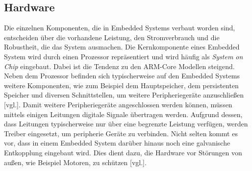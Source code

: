 \subsection{Hardware}
\label{subsec:EmbeddedHardware}
Die einzelnen Komponenten, die in Embedded Systems verbaut worden sind, entscheiden über
die vorhandene Leistung, den Stromverbrauch und die Robustheit, die das System ausmachen. Die
Kernkomponente eines Embedded System wird durch einen Prozessor repräsentiert und
wird häufig als \emph{System on Chip} eingebaut. Dabei ist die Tendenz zu den ARM-Core Modellen
steigend. Neben dem Prozessor befinden sich typischerweise auf den Embedded Systems
weitere Komponenten, wie zum Beispiel dem Hauptspeicher, dem persistenten Speicher und diversen
Schnittstellen, um weitere Peripheriegeräte anzuschließen \cite{EmbeddeHardware}[vgl.].
\newline
\newline
Damit weitere Peripheriegeräte angeschlossen werden können, müssen mittels einigen Leitungen
digitale Signale übertragen werden. Aufgrund dessen, dass Leitungen typischerweise nur über eine
begrenzte Leistung verfügen, werden Treiber eingesetzt, um peripherie Geräte zu verbinden.
Nicht selten kommt es vor, dass in einem Embedded System darüber hinaus noch eine galvanische
Entkopplung eingebaut wird. Dies dient dazu, die Hardware
vor Störungen von außen, wie Beispiel Motoren, zu schützen \cite{EmbeddedLinuxQuade}[vgl.].